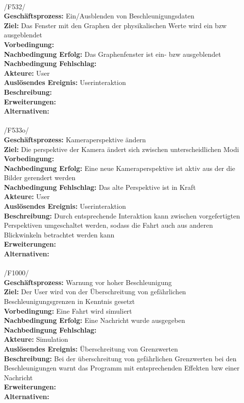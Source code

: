 \\
/F532/\\
\textbf{Geschäftsprozess:}  Ein/Ausblenden von Beschleunigungsdaten\\
\textbf{Ziel:}  Das Fenster mit den Graphen der physikalischen Werte wird ein bzw ausgeblendet\\
\textbf{Vorbedingung:} \\
\textbf{Nachbedingung Erfolg:} Das Graphenfenster ist ein- bzw ausgeblendet\\
\textbf{Nachbedingung Fehlschlag:}\\ 
\textbf{Akteure:} User\\
\textbf{Auslösendes Ereignis:} Userinteraktion\\
\textbf{Beschreibung:} \\
\textbf{Erweiterungen:}\\
\textbf{Alternativen:}\\
\\
/F533o/\\
\textbf{Geschäftsprozess:}  Kameraperspektive ändern\\
\textbf{Ziel:}  Die perspektive der Kamera ändert sich zwischen unterscheidlichen Modi\\
\textbf{Vorbedingung:} \\
\textbf{Nachbedingung Erfolg:} Eine neue Kameraperspektive ist aktiv aus der die Bilder gerendert werden\\
\textbf{Nachbedingung Fehlschlag:} Das alte Perspektive ist in Kraft\\
\textbf{Akteure:} User\\
\textbf{Auslösendes Ereignis:} Userinteraktion\\
\textbf{Beschreibung:} Durch entsprechende Interaktion kann zwischen vorgefertigten Perspektiven umgeschaltet werden, sodass die Fahrt auch aus anderen Blickwinkeln betrachtet werden kann\\
\textbf{Erweiterungen:}\\
\textbf{Alternativen:}\\
\\
/F1000/\\
\textbf{Geschäftsprozess:} Warnung vor hoher Beschleunigung\\
\textbf{Ziel:} Der User wird von der Überschreitung von gefährlichen Beschleunigungsgrenzen in Kenntnis gesetzt\\
\textbf{Vorbedingung:} Eine Fahrt wird simuliert\\
\textbf{Nachbedingung Erfolg:} Eine Nachricht wurde ausgegeben\\
\textbf{Nachbedingung Fehlschlag:} \\
\textbf{Akteure:} Simulation\\
\textbf{Auslösendes Ereignis:} Überschreitung von Grenzwerten\\
\textbf{Beschreibung:} Bei der überschreitung von gefährlichen Grenzwerten bei den Beschleunigungen warnt das Programm mit entsprechenden Effekten bzw einer Nachricht\\
\textbf{Erweiterungen:}\\
\textbf{Alternativen:}\\

